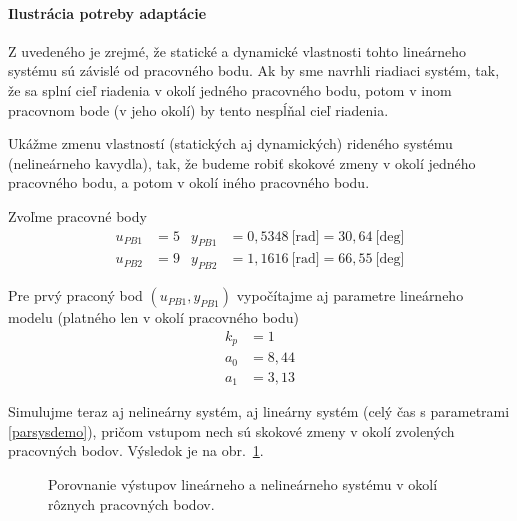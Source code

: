 \documentclass[a4paper, 10pt, ]{article}
\begin{document}
\paragraph{Ilustrácia potreby adaptácie}







Z uvedeného je zrejmé, že statické a dynamické vlastnosti tohto lineárneho systému sú závislé od pracovného bodu. Ak by sme navrhli riadiaci systém, tak, že sa splní cieľ riadenia v okolí jedného pracovného bodu, potom v inom pracovnom bode (v jeho okolí) by tento nespĺňal cieľ riadenia.

Ukážme zmenu vlastností (statických aj dynamických) rideného systému (nelineárneho kavydla), tak, že budeme robiť skokové zmeny v okolí jedného pracovného bodu, a potom v okolí iného pracovného bodu.

Zvoľme pracovné body
\begin{subequations}
    \begin{align}
        u_{PB1} &= 5 &       y_{PB1} &= 0,5348 \ \text{[rad]} = 30,64 \ \text{[deg]}\\
        u_{PB2} &= 9 &       y_{PB2} &= 1,1616 \ \text{[rad]} = 66,55 \ \text{[deg]}
    \end{align}
\end{subequations}

Pre prvý praconý bod $\left( u_{PB1}, y_{PB1} \right)$ vypočítajme aj parametre lineárneho modelu (platného len v okolí pracovného bodu)
\begin{subequations} \label{parsysdemo}
    \begin{align}
        k_p &= 1 \\
        a_0 &= 8,44 \\
        a_1 &= 3,13
    \end{align}
\end{subequations}



Simulujme teraz aj nelineárny systém, aj lineárny systém (celý čas s parametrami \eqref{parsysdemo}), pričom vstupom nech sú skokové zmeny v okolí zvolených pracovných bodov. Výsledok je na obr.~\ref{figsc_ar05_Kyvadlo_ep1_1}.




\begin{figure}[!t]
	\centering

    \vspace{-3mm}


    \vspace{-2mm}

	\caption{Porovnanie výstupov lineárneho a nelineárneho systému v okolí rôznych pracovných bodov.}
	\label{figsc_ar05_Kyvadlo_ep1_1}

    \vspace{-2mm}

\end{figure}
\end{document}
